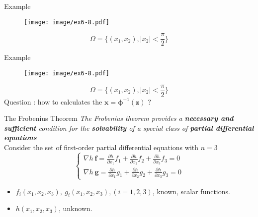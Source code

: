 \documentclass{beamer}
\renewcommand{\vec}[1]{\ensuremath{\boldsymbol{#1}}} %
\begin{document}
\begin{frame}{Example}
    \begin{figure}
      \centering
      \texttt{[image: image/ex6-8.pdf]}
    \end{figure}
    \vspace{-10pt}
    $$
    \Omega = \{ (x_{1}, x_{2}), |x_{2}| < \frac{\pi}{2} \}
    $$
\end{frame}
\begin{frame}{Example}
    \begin{figure}
      \centering
      \texttt{[image: image/ex6-8.pdf]}
    \end{figure}
    \vspace{-10pt}
    $$
    \Omega = \{ (x_{1}, x_{2}), |x_{2}| < \frac{\pi}{2} \}
    $$
    {\color{red}\large Question : how to calculates the $\vec{x}=\vec{\phi}^{-1}(\vec{z})$ ?}
\end{frame}


\begin{frame}{The Frobenius Theorem}
    \textit{The Frobenius theorem provides a \textbf{necessary and sufficient} condition for the \textbf{solvability} of a special class of \textbf{partial differential equations}}
    \\
    Consider the set of first-order partial differential equations with $n=3$
    \begin{equation}\label{partial-equation}
      \left\{ \begin{array}{c}
                \nabla h~\vec{f}=\frac{\partial h}{\partial x_{1}}f_{1}+\frac{\partial h}{\partial x_{2}}f_{2}+\frac{\partial h}{\partial x_{3}}f_{3}=0 \\
                \nabla h~\vec{g}=\frac{\partial h}{\partial x_{1}}g_{1}+\frac{\partial h}{\partial x_{2}}g_{2}+\frac{\partial h}{\partial x_{3}}g_{3}=0
              \end{array}\right.
    \end{equation}

    \begin{itemize}
      \item $f_{i}(x_{1},x_{2},x_{3}),~g_{i}(x_{1},x_{2},x_{3}), (i=1,2,3)$, known, scalar functions.
      \item $h(x_{1},x_{2},x_{3})$, unknown.
    \end{itemize}
\end{frame}
\end{document}
